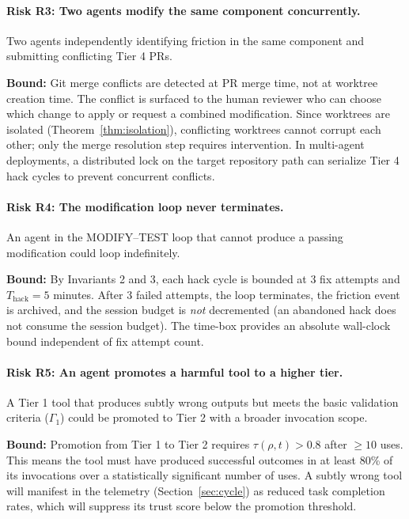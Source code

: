 \paragraph{Risk R3: Two agents modify the same component concurrently.}
Two agents independently identifying friction in the same component and
submitting conflicting Tier 4 PRs.

\textbf{Bound:} Git merge conflicts are detected at PR merge time, not at
worktree creation time. The conflict is surfaced to the human reviewer who
can choose which change to apply or request a combined modification. Since
worktrees are isolated (Theorem~\ref{thm:isolation}), conflicting worktrees
cannot corrupt each other; only the merge resolution step requires intervention.
In multi-agent deployments, a distributed lock on the target repository path
can serialize Tier 4 hack cycles to prevent concurrent conflicts.

\paragraph{Risk R4: The modification loop never terminates.}
An agent in the MODIFY--TEST loop that cannot produce a passing modification
could loop indefinitely.

\textbf{Bound:} By Invariants 2 and 3, each hack cycle is bounded at 3 fix
attempts and $T_{\text{hack}} = 5$ minutes. After 3 failed attempts, the loop
terminates, the friction event is archived, and the session budget is
\emph{not} decremented (an abandoned hack does not consume the session budget).
The time-box provides an absolute wall-clock bound independent of fix attempt
count.

\paragraph{Risk R5: An agent promotes a harmful tool to a higher tier.}
A Tier 1 tool that produces subtly wrong outputs but meets the basic validation
criteria ($\Gamma_1$) could be promoted to Tier 2 with a broader invocation scope.

\textbf{Bound:} Promotion from Tier 1 to Tier 2 requires $\tau(\rho, t) > 0.8$
after $\geq 10$ uses. This means the tool must have produced successful outcomes
in at least 80\% of its invocations over a statistically significant number of
uses. A subtly wrong tool will manifest in the telemetry (Section~\ref{sec:cycle})
as reduced task completion rates, which will suppress its trust score below the
promotion threshold.

